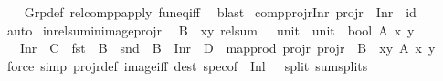 \begin{isabellebody}
%
\isadelimproof
\ \ %
\endisadelimproof
%
\isatagproof
{}\isamarkupfalse%
\ Grp{\isacharunderscore}{\kern0pt}def\ relcompp{\isacharunderscore}{\kern0pt}apply\ fun{\isacharunderscore}{\kern0pt}eq{\isacharunderscore}{\kern0pt}iff\ \isamarkupfalse%
\ blast%
\endisatagproof
{\isafoldproof}%
%
\isadelimproof
\isanewline
%
\endisadelimproof
\isanewline
{}\isamarkupfalse%
\ comp{\isacharunderscore}{\kern0pt}projr{\isacharunderscore}{\kern0pt}Inr{\isacharcolon}{\kern0pt}\ {\isachardoublequoteopen}projr\ {\isasymcirc}\ Inr\ {\isacharequal}{\kern0pt}\ id{\isachardoublequoteclose}\isanewline
%
\isadelimproof
\ \ %
\endisadelimproof
%
\isatagproof
{}\isamarkupfalse%
\ auto%
\endisatagproof
{\isafoldproof}%
%
\isadelimproof
\isanewline
%
\endisadelimproof
\isanewline
{}\isamarkupfalse%
\ in{\isacharunderscore}{\kern0pt}rel{\isacharunderscore}{\kern0pt}sum{\isacharunderscore}{\kern0pt}in{\isacharunderscore}{\kern0pt}image{\isacharunderscore}{\kern0pt}projr{\isacharcolon}{\kern0pt}\isanewline
\ \ {\isachardoublequoteopen}B\ {\isasymsubseteq}\ {\isacharbraceleft}{\kern0pt}{\isacharparenleft}{\kern0pt}x{\isacharcomma}{\kern0pt}y{\isacharparenright}{\kern0pt}{\isachardot}{\kern0pt}\ rel{\isacharunderscore}{\kern0pt}sum\ {\isacharparenleft}{\kern0pt}{\isacharparenleft}{\kern0pt}{\isacharequal}{\kern0pt}{\isacharparenright}{\kern0pt}\ {\isacharcolon}{\kern0pt}{\isacharcolon}{\kern0pt}\ unit\ {\isasymRightarrow}\ unit\ {\isasymRightarrow}\ bool{\isacharparenright}{\kern0pt}\ A\ x\ y{\isacharbraceright}{\kern0pt}\ {\isasymLongrightarrow}\isanewline
\ \ \ Inr\ {\isacharbackquote}{\kern0pt}\ C\ {\isacharequal}{\kern0pt}\ fst\ {\isacharbackquote}{\kern0pt}\ B\ {\isasymLongrightarrow}\ snd\ {\isacharbackquote}{\kern0pt}\ B\ {\isacharequal}{\kern0pt}\ Inr\ {\isacharbackquote}{\kern0pt}\ D\ {\isasymLongrightarrow}\ map{\isacharunderscore}{\kern0pt}prod\ projr\ projr\ {\isacharbackquote}{\kern0pt}\ B\ {\isasymsubseteq}\ {\isacharbraceleft}{\kern0pt}{\isacharparenleft}{\kern0pt}x{\isacharcomma}{\kern0pt}y{\isacharparenright}{\kern0pt}{\isachardot}{\kern0pt}\ A\ x\ y{\isacharbraceright}{\kern0pt}{\isachardoublequoteclose}\isanewline
%
\isadelimproof
\ \ %
\endisadelimproof
%
\isatagproof
{}\isamarkupfalse%
\ {\isacharparenleft}{\kern0pt}force\ simp{\isacharcolon}{\kern0pt}\ projr{\isacharunderscore}{\kern0pt}def\ image{\isacharunderscore}{\kern0pt}iff\ dest{\isacharbang}{\kern0pt}{\isacharcolon}{\kern0pt}\ spec{\isacharbrackleft}{\kern0pt}of\ {\isacharunderscore}{\kern0pt}\ {\isachardoublequoteopen}Inl\ {\isacharparenleft}{\kern0pt}{\isacharparenright}{\kern0pt}{\isachardoublequoteclose}{\isacharbrackright}{\kern0pt}\ \ split{\isacharcolon}{\kern0pt}\ sum{\isachardot}{\kern0pt}splits{\isacharparenright}{\kern0pt}%

\end{isabellebody}
